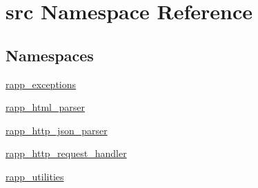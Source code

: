 \hypertarget{namespacesrc}{\section{src Namespace Reference}
\label{namespacesrc}
}
\subsection*{Namespaces}
\begin{DoxyCompactItemize}
\item 
\hyperlink{namespacesrc_1_1rapp__exceptions}{rapp\-\_\-exceptions}
\item 
\hyperlink{namespacesrc_1_1rapp__html__parser}{rapp\-\_\-html\-\_\-parser}
\item 
\hyperlink{namespacesrc_1_1rapp__http__json__parser}{rapp\-\_\-http\-\_\-json\-\_\-parser}
\item 
\hyperlink{namespacesrc_1_1rapp__http__request__handler}{rapp\-\_\-http\-\_\-request\-\_\-handler}
\item 
\hyperlink{namespacesrc_1_1rapp__utilities}{rapp\-\_\-utilities}
\end{DoxyCompactItemize}
